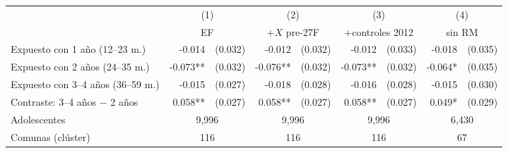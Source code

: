 \begin{tabular}{l rl rl rl rl}
\toprule
 & \multicolumn{2}{c}{(1)} & \multicolumn{2}{c}{(2)} & \multicolumn{2}{c}{(3)} & \multicolumn{2}{c}{(4)} \\
 & \multicolumn{2}{c}{EF} & \multicolumn{2}{c}{$+X$ pre-27F} & \multicolumn{2}{c}{$+$controles 2012} & \multicolumn{2}{c}{sin RM} \\
\midrule
Expuesto con 1 a\~no (12--23 m.) & -0.014 & (0.032) & -0.012 & (0.032) & -0.012 & (0.033) & -0.018 & (0.035) \\
Expuesto con 2 a\~nos (24--35 m.) & -0.073** & (0.032) & -0.076** & (0.032) & -0.073** & (0.032) & -0.064* & (0.035) \\
Expuesto con 3--4 a\~nos (36--59 m.) & -0.015 & (0.027) & -0.018 & (0.028) & -0.016 & (0.028) & -0.015 & (0.030) \\
\addlinespace
Contraste: 3--4 a\~nos $-$ 2 a\~nos & 0.058** & (0.027) & 0.058** & (0.027) & 0.058** & (0.027) & 0.049* & (0.029) \\
\midrule
Adolescentes & \multicolumn{2}{c}{9,996} & \multicolumn{2}{c}{9,996} & \multicolumn{2}{c}{9,996} & \multicolumn{2}{c}{6,430} \\
Comunas (cl\'uster) & \multicolumn{2}{c}{116} & \multicolumn{2}{c}{116} & \multicolumn{2}{c}{116} & \multicolumn{2}{c}{67} \\
\bottomrule
\end{tabular}
